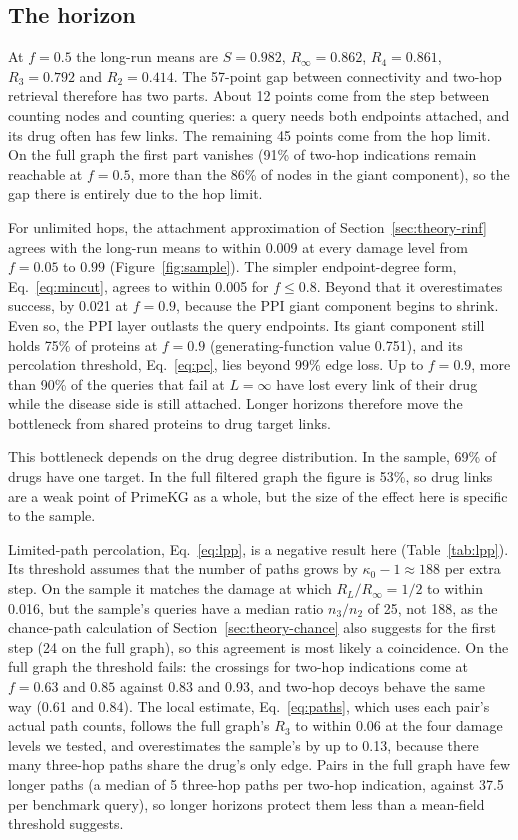 \subsection{The horizon}
\label{sec:blind-horizon}

At $f=0.5$ the long-run means are $S=0.982$, $R_\infty=0.862$, $R_4=0.861$,
$R_3=0.792$ and $R_2=0.414$. The 57-point gap between connectivity and two-hop
retrieval therefore has two parts. About 12 points come from the step between
counting nodes and counting queries: a query needs both endpoints attached, and
its drug often has few links. The remaining 45 points come from the hop limit.
On the full graph the first part vanishes (91\% of two-hop indications remain
reachable at $f=0.5$, more than the 86\% of nodes in the giant component), so the
gap there is entirely due to the hop limit.

For unlimited hops, the attachment approximation of Section~\ref{sec:theory-rinf} agrees with the long-run means to within
0.009 at every damage level from $f=0.05$ to $0.99$ (Figure~\ref{fig:sample}).
The simpler endpoint-degree form, Eq.~\eqref{eq:mincut}, agrees to within 0.005 for
$f\le0.8$. Beyond that it overestimates success, by 0.021 at $f=0.9$, because
the PPI giant component begins to shrink. Even so, the PPI layer outlasts the
query endpoints. Its giant component still holds 75\% of proteins at $f=0.9$
(generating-function value 0.751), and its percolation threshold, Eq.~\eqref{eq:pc}, lies beyond
99\% edge loss. Up to $f=0.9$, more than 90\% of the queries that fail at
$L=\infty$ have lost every link of their drug while the disease side is still
attached. Longer horizons therefore move the bottleneck from shared proteins to
drug target links.

This bottleneck depends on the drug degree distribution. In the sample, 69\% of
drugs have one target. In the full filtered graph the figure is 53\%, so drug
links are a weak point of PrimeKG as a whole, but the size of the effect here
is specific to the sample.


Limited-path percolation, Eq.~\eqref{eq:lpp}, is a negative result here
(Table~\ref{tab:lpp}). Its threshold assumes that the number of paths grows by
$\kappa_0-1\approx188$ per extra step. On the sample it matches the damage at
which $R_L/R_\infty=1/2$ to within 0.016, but the sample's queries have a median
ratio $n_3/n_2$ of 25, not 188, as the chance-path calculation of
Section~\ref{sec:theory-chance} also suggests for the first step (24 on the
full graph), so this agreement is most likely a coincidence. On the full graph the threshold fails: the
crossings for two-hop indications come at $f=0.63$ and $0.85$ against 0.83 and
0.93, and two-hop decoys behave the same way (0.61 and 0.84). The local estimate,
Eq.~\eqref{eq:paths}, which uses each pair's actual path counts, follows the
full graph's $R_3$ to within 0.06 at the four damage levels we tested, and
overestimates the sample's by up to 0.13, because there many three-hop paths
share the drug's only edge. Pairs in the full graph have few longer paths (a
median of 5 three-hop paths per two-hop indication, against 37.5 per benchmark
query), so longer horizons protect them less than a mean-field threshold
suggests.

